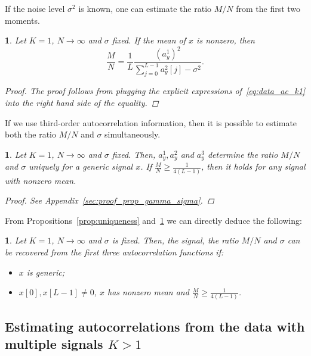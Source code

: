 \documentclass[english,11pt]{article}
\numberwithin{equation}{section}
\theoremstyle{plain}
\theoremstyle{definition}
\theoremstyle{remark}
\theoremstyle{plain}
\theoremstyle{remark}
\theoremstyle{plain}
\newtheorem{corollary}[thm]{\protect\corollaryname}
\theoremstyle{plain}
\newtheorem{proposition}[thm]{\protect\propositionname}
\providecommand{\corollaryname}{Corollary}
\providecommand{\propositionname}{Proposition}
\begin{document}
If the noise level $\sigma^2$ is known, one can estimate the ratio $M/N$ from the first two moments.
\begin{proposition} \label{prop:gamma}
	Let $K=1$, $N\to\infty$ and $\sigma$ fixed. If the mean of $x$ is nonzero, then 
	\begin{equation*}
	\frac{M}{N} = \frac{1}{L}\frac{(a^1_y)^2}{\sum_{j=0}^{L-1}a_y^2[j]-\sigma^2}.
	\end{equation*}
	\begin{proof}
The proof follows from plugging the explicit expressions of~\eqref{eq:data_ac_k1} into the right hand side of the equality.
\end{proof}
\end{proposition}

If we use third-order autocorrelation information, then it is possible to estimate both the ratio $M/N$ and $\sigma$ simultaneously.
\begin{proposition} \label{prop:gamma_sigma}
	Let $K=1$, $N\to\infty$ and $\sigma$ fixed. Then, $a_y^1,a_y^2$ and  $a_y^3$ determine the ratio $M/N$ and $\sigma$ uniquely for a generic signal $x$. If $\frac{M}{N}\geq\frac{1}{4(L-1)}$, then it holds for any signal with nonzero mean. 
	\begin{proof}
		See Appendix~\ref{sec:proof_prop_gamma_sigma}.
	\end{proof}
\end{proposition}

From Propositions~\ref{prop:uniqueness} and~\ref{prop:gamma_sigma} we can directly deduce the following:
\begin{corollary}
	Let $K=1$, $N\to\infty$ and $\sigma$ is fixed. Then, the signal, the ratio $M/N$ and $\sigma$ can be recovered from the first three autocorrelation functions if:
	\begin{itemize}
		\item $x$ is generic;
		\item  $x[0],x[L-1]\neq 0$, $x$ has nonzero mean and $\frac{M}{N}\geq\frac{1}{4(L-1)}$.
	\end{itemize}
\end{corollary}
 
 
\subsection{Estimating autocorrelations from the data with multiple signals $K>1$} \label{sec:estimating_ac}
\end{document}
